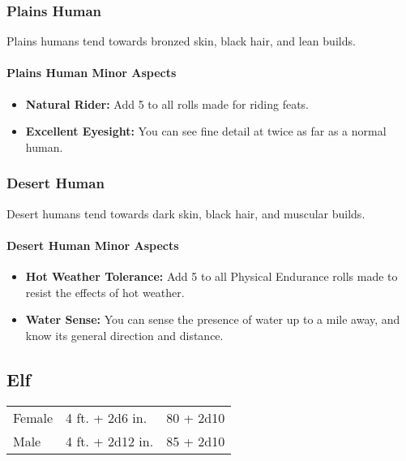 \begin{multicols}{2}
\subsubsection{Plains Human}

Plains humans tend towards bronzed skin, black hair, and lean builds.

\paragraph{Plains Human Minor Aspects}

\begin{itemize}
    \item \textbf{Natural Rider:} Add 5 to all rolls made for riding feats.
    \item \textbf{Excellent Eyesight:} You can see fine detail at twice as far as a normal human.
\end{itemize}

\subsubsection{Desert Human}

Desert humans tend towards dark skin, black hair, and muscular builds.

\paragraph{Desert Human Minor Aspects}

\begin{itemize}
    \item \textbf{Hot Weather Tolerance:} Add 5 to all Physical Endurance rolls made to resist the effects of hot weather.
    \item \textbf{Water Sense:} You can sense the presence of water up to a mile away, and know its general direction and distance.
\end{itemize}

\subsection{Elf}

\begin{center}
\begin{xtabular}{|l|l|l|}
Female & 4 ft. + 2d6 in. & 80 + 2d10 \\
Male & 4 ft. + 2d12 in. & 85 + 2d10 \\
\hline
\end{xtabular}
\end{center}


\end{multicols}
